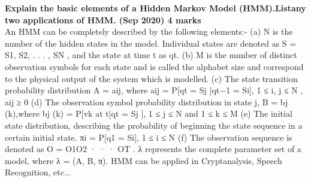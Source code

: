 \textbf{\textcolor{LightMagenta}{ Explain the basic elements of a Hidden Markov Model (HMM).Listany two applications of HMM. (Sep 2020) \hfill 4 marks}} \\[5pt]
{ An HMM can be completely described by the following elements:-
\newline(a) N is the number of the hidden states in the model. Individual states are denoted as S = {S1, S2, . . . , SN }, and the state at time t as qt.\newline
(b) M is the number of distinct observation symbols for each state and is called the alphabet size and correspond to the physical output of the system which is modelled.\newline
(c) The state transition probability distribution A = {aij}, where aij = P[qt = Sj |qt−1 = Si], 1 ≤ i, j ≤ N ,  aij ≥ 0 \newline
(d) The observation symbol probability distribution in state j, B = {bj (k)},where bj (k) = P[vk at t|qt = Sj ], 1 ≤ j ≤ N and 1 ≤ k ≤ M \newline
(e) The initial state distribution, describing the probability of beginning the state sequence in a certain initial state.
πi = P[q1 = Si], 1 ≤ i ≤ N \newline
(f) The observation sequence is denoted as O = O1O2 · · · OT .
λ represents the complete parameter set of a model, where λ = (A, B, π).\newline
HMM can be applied in Cryptanalysis, Speech Recognition, etc...}